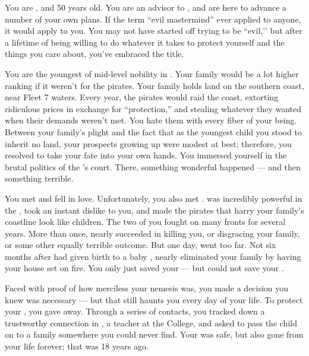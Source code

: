 \documentclass[char]{GL2020}
\begin{document}
\name{\cEvil{}}

You are \cEvil{\intro}, and 50 years old. You are an advisor to \cQueen{\intro}, and are here to advance a number of your own plans. If the term ``evil mastermind'' ever applied to anyone, it would apply to you. You may not have started off trying to be ``evil,’’ but after a lifetime of being willing to do whatever it takes to protect yourself and the things you care about, you've embraced the title.

You are the youngest \cEvil{\offspring} of mid-level nobility in \pFarm{}. Your family would be a lot higher ranking if it weren't for the pirates. Your family holds land on the southern coast, near Fleet 7 waters. Every year, the pirates would raid the coast, extorting ridiculous prices in exchange for ``protection,'' and stealing whatever they wanted when their demands weren't met. You hate them with every fiber of your being. Between your family's plight and the fact that as the youngest child you stood to inherit no land, your prospects growing up were modest at best; therefore, you resolved to take your fate into your own hands. You immersed yourself in the brutal politics of the \cQueen{\Monarch}'s court. There, something wonderful happened — and then something terrible.

You met \cPirateChildParent{\intro} and fell in love. Unfortunately, you also met \cEvilNemesis{\intro}. \cEvilNemesis{} was incredibly powerful in the \pFarm{}, took an instant dislike to you, and made the pirates that harry your family's coastline look like children. The two of you fought on many fronts for several years. More than once, \cEvilNemesis{\they} nearly succeeded in killing you, or disgracing your family, or some other equally terrible outcome. But one day, \cEvilNemesis{\they} went too far. Not six months after \cPirateChildParent{} had given birth to a baby \cPirateChild{\child}, \cEvilNemesis{} nearly eliminated your family by having your house set on fire. You only just saved your \cPirateChild{\offspring} — but could not save your \cPirateChildParent{\spouse}.

Faced with proof of how merciless your nemesis was, you made a decision you knew was necessary — but that still haunts you every day of your life. To protect your \cPirateChild{\offspring}, you gave \cPirateChild{\them} away. Through a series of contacts, you tracked down a trustworthy connection in \cEthics{\intro}, a teacher at the College, and asked \cEthics{\them} to pass the child on to a family somewhere you could never find. Your \cPirateChild{\offspring} was safe, but \cPirateChild{\theywere} also gone from your life forever; that was 18 years ago.
\end{document}
